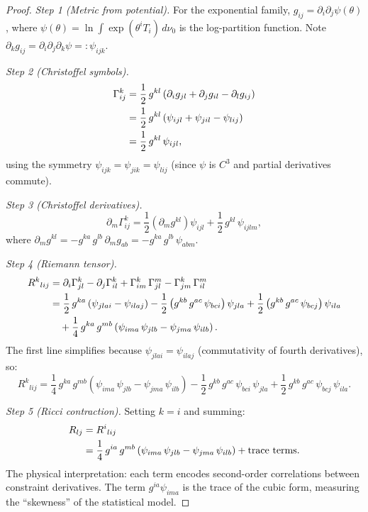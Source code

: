 \begin{proof}
\emph{Step 1 (Metric from potential).}  For the exponential family,
$g_{ij} = \partial_i \partial_j \psi(\theta)$, where
$\psi(\theta) = \ln\int\exp(\theta^i T_i)\,d\nu_0$ is the
log-partition function.  Note
$\partial_k g_{ij} = \partial_i \partial_j \partial_k \psi =:
\psi_{ijk}$.

\emph{Step 2 (Christoffel symbols).}
\begin{align}
  \Gamma^k_{ij} &= \frac{1}{2}\,g^{kl}\left(
    \partial_i g_{jl} + \partial_j g_{il} - \partial_l g_{ij}
  \right) \notag \\
  &= \frac{1}{2}\,g^{kl}\left(\psi_{ijl} + \psi_{jil}
  - \psi_{lij}\right) \notag \\
  &= \frac{1}{2}\,g^{kl}\,\psi_{ijl}, \label{eq:christoffel-exp}
\end{align}
using the symmetry $\psi_{ijk} = \psi_{jik} = \psi_{lij}$ (since
$\psi$ is $C^3$ and partial derivatives commute).

\emph{Step 3 (Christoffel derivatives).}
\begin{equation}\label{eq:dchristoffel}
  \partial_m \Gamma^k_{ij}
  = \frac{1}{2}\left(\partial_m g^{kl}\right)\psi_{ijl}
  + \frac{1}{2}\,g^{kl}\,\psi_{ijlm},
\end{equation}
where $\partial_m g^{kl} = -g^{ka}\,g^{lb}\,\partial_m g_{ab}
= -g^{ka}\,g^{lb}\,\psi_{abm}$.

\emph{Step 4 (Riemann tensor).}
\begin{align}
  R^k{}_{lij} &= \partial_i \Gamma^k_{jl}
  - \partial_j \Gamma^k_{il}
  + \Gamma^k_{im}\,\Gamma^m_{jl}
  - \Gamma^k_{jm}\,\Gamma^m_{il} \notag \\
  &= \frac{1}{2}\,g^{ka}\left(\psi_{jlai} - \psi_{ilaj}\right)
  - \frac{1}{2}\left(g^{kb}\,g^{ac}\,\psi_{bci}\right)\psi_{jla}
  + \frac{1}{2}\left(g^{kb}\,g^{ac}\,\psi_{bcj}\right)\psi_{ila}
  \notag \\
  &\quad + \frac{1}{4}\,g^{ka}\,g^{mb}\left(
    \psi_{ima}\,\psi_{jlb} - \psi_{jma}\,\psi_{ilb}
  \right). \label{eq:riemann-exp}
\end{align}
The first line simplifies because $\psi_{jlai} = \psi_{ilaj}$
(commutativity of fourth derivatives), so:
\[
  R^k{}_{lij} = \frac{1}{4}\,g^{ka}\,g^{mb}\left(
    \psi_{ima}\,\psi_{jlb} - \psi_{jma}\,\psi_{ilb}
  \right)
  - \frac{1}{2}\,g^{kb}\,g^{ac}\,\psi_{bci}\,\psi_{jla}
  + \frac{1}{2}\,g^{kb}\,g^{ac}\,\psi_{bcj}\,\psi_{ila}.
\]

\emph{Step 5 (Ricci contraction).}
Setting $k = i$ and summing:
\begin{align}
  R_{lj} &= R^i{}_{lij} \notag \\
  &= \frac{1}{4}\,g^{ia}\,g^{mb}\left(
    \psi_{ima}\,\psi_{jlb} - \psi_{jma}\,\psi_{ilb}
  \right)
  + \text{trace terms}. \label{eq:ricci-contract}
\end{align}
The physical interpretation: each term encodes second-order
correlations between constraint derivatives.  The term
$g^{ia}\psi_{ima}$ is the trace of the cubic form, measuring
the ``skewness'' of the statistical model.


\end{proof}
